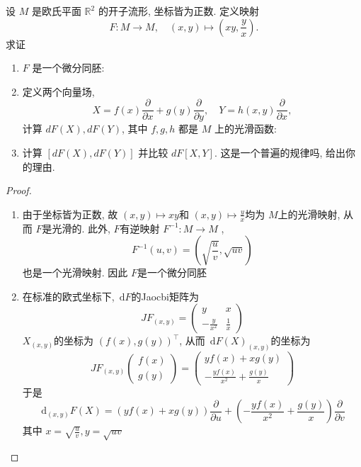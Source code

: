 \documentclass[../main.tex]{subfiles}
\begin{document}
\begin{exercise}{}{}
设 $M$ 是欧氏平面 $\mathbb{R}^2$ 的开子流形, 坐标皆为正数. 定义映射
\[
F: M \to M, \quad (x, y) \mapsto (xy, \frac{y}{x}).
\]
求证
\begin{enumerate}
    \item $F$ 是一个微分同胚:
    \item 定义两个向量场,
    \[
    X = f(x)\frac{\partial}{\partial x} + g(y)\frac{\partial}{\partial y}, \quad Y = h(x, y)\frac{\partial}{\partial x},
    \]
    计算 $dF(X), dF(Y)$, 其中 $f, g, h$ 都是 $M$ 上的光滑函数:
    \item 计算 $[dF(X),dF(Y)]$ 并比较 $dF[X,Y]$. 这是一个普遍的规律吗, 给出你的理由.
\end{enumerate}
\end{exercise}

\begin{proof}
    \begin{enumerate}
        \item 由于坐标皆为正数, 故 \(  \left( x,y \right)\mapsto  xy   \)和 \(  \left( x,y \right)\mapsto \frac{y }{x }    \)均为 \(  M  \)上的光滑映射, 从而 \(  F  \)是光滑的. 此外,  \(  F  \)有逆映射  \(  F^{-1} :M\to M  \) ,\[
        F^{-1} \left( u,v \right)= \left( \sqrt{\frac{u }{v } }, \sqrt{uv} \right)  
        \]   也是一个光滑映射.  因此 \(  F  \)是一个微分同胚
        \item  在标准的欧式坐标下,  \(  \,\mathrm{d} F  \)的Jaocbi矩阵为 \[
        JF_{\left( x,y \right) }= \begin{pmatrix} 
            y& x\\ 
             -\frac{y }{x^{2} }& \frac{1 }{x }   
        \end{pmatrix} 
        \] \(  X _{\left( x,y \right) } \)的坐标为 \(  \left( f\left( x \right),g\left( y \right)   \right)^{\top}   \), 从而 \(  \,\mathrm{d} F\left( X \right)_{\left( x,y \right) }   \)的坐标为 \[
        JF_{\left( x,y \right) } \begin{pmatrix} 
            f\left( x \right)\\ 
             g\left( y \right)   
        \end{pmatrix}= \begin{pmatrix} 
              yf\left( x \right)+ xg\left( y \right)\\ 
               -\frac{yf\left( x \right)  }{x^{2} }+ \frac{g\left( y \right)  }{x }    
        \end{pmatrix}  
        \]   于是 \[
        \,\mathrm{d}_{\left( x,y \right) } F\left( X \right)= \left( yf\left( x \right)+ xg\left( y \right)   \right)\frac{\partial }{\partial u}+ \left( -\frac{yf\left( x \right)  }{x^{2} }+ \frac{g\left( y \right)  }{x }   \right)\frac{\partial }{\partial v}   
        \] 其中 \(  x= \sqrt{\frac{u }{v } }, y= \sqrt{uv}  \) 
        


\end{enumerate}
\end{proof}
\end{document}
